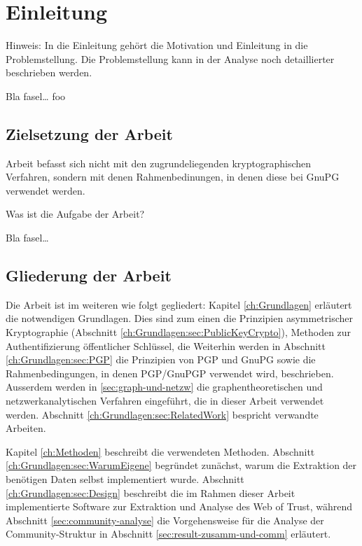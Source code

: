 
\chapter{Einleitung}
\label{ch:Einleitung}
Hinweis: In die Einleitung gehört die Motivation 
und Einleitung in die Problemstellung. Die Problemstellung
kann in der Analyse noch detaillierter beschrieben werden.

Bla fasel\ldots
foo


\section{Zielsetzung der Arbeit}
\label{ch:Einleitung:sec:Zielsetzung}

Arbeit befasst sich nicht mit den zugrundeliegenden kryptographischen
Verfahren, sondern mit denen Rahmenbedinungen, in denen diese bei
GnuPG verwendet werden.

Was ist die Aufgabe der Arbeit?

Bla fasel\ldots

\section{Gliederung der Arbeit}
\label{ch:Einleitung:sec:Gliederung}

Die Arbeit ist im weiteren wie folgt gegliedert: Kapitel
\ref{ch:Grundlagen} erl\"autert die notwendigen Grundlagen. Dies sind
zum einen die Prinzipien asymmetrischer Kryptographie (Abschnitt
\ref{ch:Grundlagen:sec:PublicKeyCrypto}), Methoden zur
Authentifizierung \"offentlicher Schl\"ussel, die Weiterhin werden in
Abschnitt \ref{ch:Grundlagen:sec:PGP} die Prinzipien von PGP und GnuPG
sowie die Rahmenbedingungen, in denen PGP/GnuPGP verwendet wird,
beschrieben. Ausserdem werden in \ref{sec:graph-und-netzw} die
graphentheoretischen und netzwerkanalytischen Verfahren eingef\"uhrt,
die in dieser Arbeit verwendet werden. Abschnitt
\ref{ch:Grundlagen:sec:RelatedWork} bespricht verwandte Arbeiten.

Kapitel \ref{ch:Methoden} beschreibt die verwendeten
Methoden. Abschnitt \ref{ch:Grundlagen:sec:WarumEigene} begr\"undet
zun\"achst, warum die Extraktion der ben\"otigen Daten selbst
implementiert wurde. Abschnitt \ref{ch:Grundlagen:sec:Design} beschreibt die
im Rahmen dieser Arbeit implementierte Software zur Extraktion und
Analyse des Web of Trust, w\"ahrend Abschnitt
\ref{sec:community-analyse} die Vorgehensweise f\"ur die Analyse der
Community-Struktur in Abschnitt \ref{sec:result-zusamm-und-comm}
erl\"autert.


